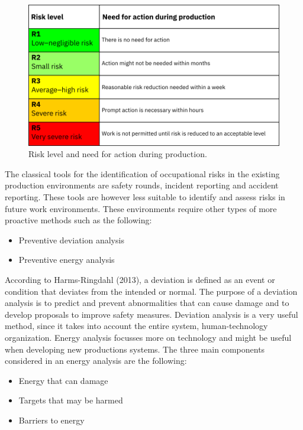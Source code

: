 \documentclass[
  12pt,
]{scrbook}
\begin{document}
\begin{figure}
\hypertarget{fig:tablec}{%
\centering
\includegraphics{./media/risk-level-production.png}
\caption{Risk level and need for action during production.}\label{fig:tablec}
}
\end{figure}

The classical tools for the identification of occupational risks in the existing production environments are safety rounds, incident reporting and accident reporting. These tools are however less suitable to identify and assess risks in future work environments. These environments require other types of more proactive methods such as the following:

\begin{itemize}
\item
  Preventive deviation analysis
\item
  Preventive energy analysis
\end{itemize}

According to Harms-Ringdahl (2013), a deviation is defined as an event or condition that deviates from the intended or normal. The purpose of a deviation analysis is to predict and prevent abnormalities that can cause damage and to develop proposals to improve safety measures. Deviation analysis is a very useful method, since it takes into account the entire system, human-technology organization. Energy analysis focusses more on technology and might be useful when developing new productions systems. The three main components considered in an energy analysis are the following:

\begin{itemize}
\item
  Energy that can damage
\item
  Targets that may be harmed
\item
  Barriers to energy
\end{itemize}
\end{document}
